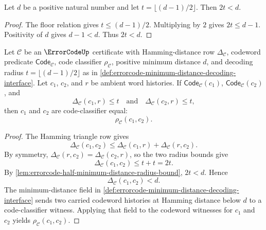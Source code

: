 \begin{lemma}
\label{lem:errorcode-half-minimum-distance-radius-bound}
Let $d$ be a positive natural number and let $t=\lfloor(d-1)/2\rfloor$. Then $2t<d$.
\end{lemma}
\begin{proof}
The floor relation gives $t\le(d-1)/2$. Multiplying by $2$ gives $2t\le d-1$. Positivity of $d$ gives $d-1<d$. Thus $2t<d$.
\end{proof}

\begin{theorem}
\label{thm:errorcode-unique-decoding-radius}
Let $\mathcal C$ be an $\ErrorCodeUp$ certificate with Hamming-distance row $\Delta_{\mathcal C}$, codeword predicate $\mathsf{Code}_{\mathcal C}$, code classifier $\rho_{\mathcal C}$, positive minimum distance $d$, and decoding radius $t=\lfloor(d-1)/2\rfloor$ as in \autoref{def:errorcode-minimum-distance-decoding-interface}. Let $c_1$, $c_2$, and $r$ be ambient word histories. If $\mathsf{Code}_{\mathcal C}(c_1)$, $\mathsf{Code}_{\mathcal C}(c_2)$, and
$$
\Delta_{\mathcal C}(c_1,r)\le t
\quad\text{and}\quad
\Delta_{\mathcal C}(c_2,r)\le t,
$$
then $c_1$ and $c_2$ are code-classifier equal:
$$
\rho_{\mathcal C}(c_1,c_2).
$$
\end{theorem}
\begin{proof}
The Hamming triangle row gives
$$
\Delta_{\mathcal C}(c_1,c_2)
\le
\Delta_{\mathcal C}(c_1,r)+\Delta_{\mathcal C}(r,c_2).
$$
By symmetry, $\Delta_{\mathcal C}(r,c_2)=\Delta_{\mathcal C}(c_2,r)$, so the two radius bounds give
$$
\Delta_{\mathcal C}(c_1,c_2)
\le
t+t
=
2t.
$$
By \autoref{lem:errorcode-half-minimum-distance-radius-bound}, $2t<d$. Hence
$$
\Delta_{\mathcal C}(c_1,c_2)<d.
$$
The minimum-distance field in \autoref{def:errorcode-minimum-distance-decoding-interface} sends two carried codeword histories at Hamming distance below $d$ to a code-classifier witness. Applying that field to the codeword witnesses for $c_1$ and $c_2$ yields $\rho_{\mathcal C}(c_1,c_2)$.
\end{proof}

